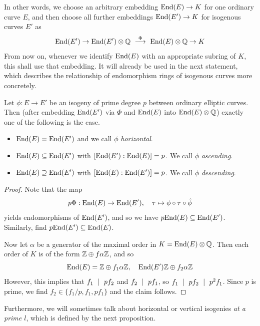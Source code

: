 In other words, we choose an arbitrary embedding $\mathrm{End}(E) \to K$ for one ordinary curve $E$, and then choose all further embeddings $\mathrm{End}(E') \to K$ for isogenous curves $E'$ as
\begin{equation*}
    \End(E') \to \End(E') \otimes \Q \ \overset{\Phi}{\longrightarrow} \ \End(E) \otimes \Q \to K
\end{equation*}
From now on, whenever we identify $\mathrm{End}(E)$ with an appropriate subring of $K$, this shall use that embedding.
It will already be used in the next statement, which describes the relationship of endomorphism rings of isogenous curves more concretely.
\begin{prop}
    Let $\phi: E \to E'$ be an isogeny of prime degree $p$ between ordinary elliptic curves.
    Then (after embedding $\mathrm{End}(E')$ via $\Phi$ and $\mathrm{End}(E)$ into $\mathrm{End}(E) \otimes \mathbb{Q}$) exactly one of the following is the case.
    \begin{itemize}
        \item $\mathrm{End}(E) = \mathrm{End}(E')$ and we call $\phi$ \emph{horizontal}.
        \item $\mathrm{End}(E) \subseteq \mathrm{End}(E')$ with $[\mathrm{End}(E') : \mathrm{End}(E)] = p$. We call $\phi$ \emph{ascending}.
        \item $\mathrm{End}(E) \supseteq \mathrm{End}(E')$ with $[\mathrm{End}(E) : \mathrm{End}(E')] = p$. We call $\phi$ \emph{descending}.
    \end{itemize}
\end{prop}
\begin{proof}
    Note that the map
    \begin{equation*}
        p\Phi: \mathrm{End}(E) \to \mathrm{End}(E'), \quad \tau \mapsto \phi \circ \tau \circ \hat{\phi}
    \end{equation*}
    yields endomorphisms of $\mathrm{End}(E')$, and so we have $p\mathrm{End}(E) \subseteq \mathrm{End}(E')$.
    Similarly, find $p\mathrm{End}(E') \subseteq \mathrm{End}(E)$.

    Now let $\alpha$ be a generator of the maximal order in $K = \mathrm{End}(E) \otimes \mathbb{Q}$.
    Then each order of $K$ is of the form $\mathbb{Z} \oplus f\alpha\mathbb{Z}$, and so
    \begin{equation*}
        \mathrm{End}(E) = \mathbb{Z} \oplus f_1\alpha\mathbb{Z}, \quad \mathrm{End}(E') \mathbb{Z} \oplus f_2\alpha\mathbb{Z}
    \end{equation*}
    However, this implies that $f_1 \ \mid \  pf_2$ and $f_2 \ \mid \  pf_1$, so $f_1 \ \mid \  p f_2 \ \mid \  p^2 f_1$.
    Since $p$ is prime, we find $f_2 \in \{ f_1/p, f_1, p f_1 \}$ and the claim follows.
\end{proof}
Furthermore, we will sometimes talk about horizontal or vertical isogenies \emph{at a prime $l$}, which is defined by the next proposition.
